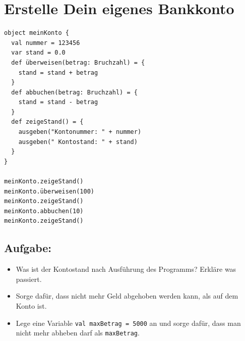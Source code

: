 \chapter{Erstelle Dein eigenes Bankkonto}
\begin{multicols}{2}

\begin{lstlisting}[basicstyle={\ttfamily\fontsize{16}{19}\selectfont},numbers=none]
object meinKonto {
  val nummer = 123456
  var stand = 0.0
  def überweisen(betrag: Bruchzahl) = {
    stand = stand + betrag 
  }
  def abbuchen(betrag: Bruchzahl) = { 
    stand = stand - betrag 
  }
  def zeigeStand() = {
    ausgeben("Kontonummer: " + nummer) 
    ausgeben(" Kontostand: " + stand)
  }
}

meinKonto.zeigeStand()
meinKonto.überweisen(100)
meinKonto.zeigeStand()
meinKonto.abbuchen(10)
meinKonto.zeigeStand()
\end{lstlisting}
        


\columnbreak


\section*{\color{BrickRed}Aufgabe:}


\begin{itemize}

\item {Was ist der Kontostand nach Ausführung des Programms? Erkläre was passiert.}
\item {Sorge dafür, dass nicht mehr Geld abgehoben werden kann, als auf dem Konto ist.}
\item {Lege eine Variable \lstinline{val maxBetrag = 5000} an und sorge dafür, dass man nicht mehr abheben darf als \lstinline{maxBetrag}.}

\end{itemize}


\end{multicols}

